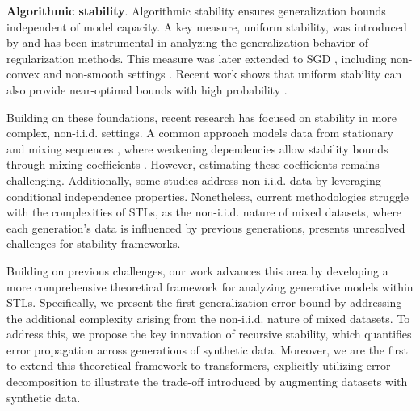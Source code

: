\textbf{Algorithmic stability}. Algorithmic stability ensures generalization bounds independent of model capacity. A key measure, uniform stability, was introduced by \cite{bousquet2002stability} and has been instrumental in analyzing the generalization behavior of regularization methods. This measure was later extended to SGD \citep{hardt2016train}, including non-convex and non-smooth settings \citep{charles2018stability,bassily2020stability,lei2023stability}. Recent work shows that uniform stability can also provide near-optimal bounds with high probability \citep{feldman2019high,bousquet2020sharper,klochkov2021stability,li2021high,wang2024generalization}.


Building on these foundations, recent research has focused on stability in more complex, non-i.i.d. settings. A common approach models data from stationary and mixing sequences \citep{Doukhan1994,yu1994rates}, where weakening dependencies allow stability bounds through mixing coefficients \citep{mohri2010stability,he2016stability,fu2023sharper}. However, estimating these coefficients remains challenging. Additionally, some studies \citep{zheng2023toward} address non-i.i.d. data by leveraging conditional independence properties. Nonetheless, current methodologies struggle with the complexities of STLs, as the non-i.i.d. nature of mixed datasets, where each generation's data is influenced by previous generations, presents unresolved challenges for stability frameworks.

\begin{remark}
 Building on previous challenges, our work advances this area by developing a more comprehensive theoretical framework for analyzing generative models within STLs. Specifically, we present the first generalization error bound by addressing the additional complexity arising from the non-i.i.d. nature of mixed datasets. To address this, we propose the key innovation of recursive stability, which quantifies error propagation across generations of synthetic data. Moreover, we are the first to extend this theoretical framework to transformers, explicitly utilizing error decomposition to illustrate the trade-off introduced by augmenting datasets with synthetic data.
\end{remark}


